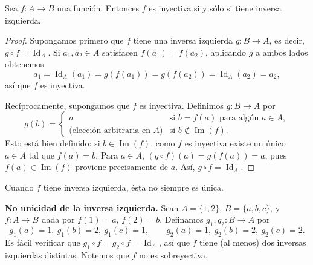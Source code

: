 \documentclass[12pt,a4paper]{book}
\begin{document}
    \begin{teorema}
        Sea $f\colon A \to B$ una función. Entonces $f$ es inyectiva si y sólo si tiene inversa izquierda.
    \end{teorema}
    \begin{proof}
        Supongamos primero que $f$ tiene una inversa izquierda $g:B\to A$, es decir, $g\circ f=\operatorname{Id}_A$. Si $a_1,a_2\in A$ satisfacen $f(a_1)=f(a_2)$, aplicando $g$ a ambos lados obtenemos
        \begin{equation*}
            a_1 = \operatorname{Id}_A(a_1) = g(f(a_1)) = g(f(a_2)) = \operatorname{Id}_A(a_2) = a_2,
        \end{equation*}
        así que $f$ es inyectiva.

        Recíprocamente, supongamos que $f$ es inyectiva. Definimos $g:B\to A$ por
        \begin{equation*}
            g(b) = \begin{cases} a & \text{si } b=f(a) \text{ para algún } a\in A, \\ \text{(elección arbitraria en $A$)} & \text{si } b\notin\operatorname{Im}(f). \end{cases}
        \end{equation*}
        Esto está bien definido: si $b\in\operatorname{Im}(f)$, como $f$ es inyectiva existe un único $a\in A$ tal que $f(a)=b$. Para $a\in A$, $(g\circ f)(a) = g(f(a)) = a$, pues $f(a)\in\operatorname{Im}(f)$ proviene precisamente de $a$. Así, $g\circ f=\operatorname{Id}_A$.
    \end{proof}

    Cuando $f$ tiene inversa izquierda, ésta no siempre es única.

    \begin{ejemplo}
        \textbf{No unicidad de la inversa izquierda.}
        Sean $A=\{1,2\}$, $B=\{a,b,c\}$, y $f:A\to B$ dada por $f(1)=a$, $f(2)=b$. Definamos $g_1,g_2:B\to A$ por
        \begin{equation*}
            g_1(a)=1,\ g_1(b)=2,\ g_1(c)=1, \qquad g_2(a)=1,\ g_2(b)=2,\ g_2(c)=2.
        \end{equation*}
        Es fácil verificar que $g_1\circ f = g_2\circ f = \operatorname{Id}_A$, así que $f$ tiene (al menos) dos inversas izquierdas distintas. Notemos que $f$ no es sobreyectiva.
    \end{ejemplo}
\end{document}
